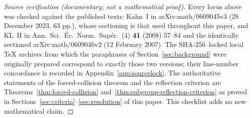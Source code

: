 \begin{proof}[Source verification (documentary; not a mathematical proof)]
Every locus above was checked against the published texts: Kahn~I in
arXiv:math/0609045v3 (28 December 2023, 63 pp.), whose sectioning is
that used throughout this paper, and KL~II in
Ann.\ Sci.\ \'Ec.\ Norm.\ Sup\'er.\ (4) \textbf{41} (2008) 57--84 and
the identically sectioned arXiv:math/0609046v2 (12 February 2007).
The SHA-256--locked local \TeX{} archives from which the paraphrases of
Section~\ref{sec:background} were originally prepared correspond to
exactly those two versions; their line-number concordance is recorded
in Appendix~\ref{app:sourcelock}.  The authoritative statements of the
forced-collision theorem and the reflection criterion are
Theorems~\ref{thm:forced-collision}
and~\ref{thm:subgroup-reflection-criterion} as proved in
Sections~\ref{sec:criteria}--\ref{sec:resolution} of this paper.  This
checklist adds no new mathematical claim.
\end{proof}
